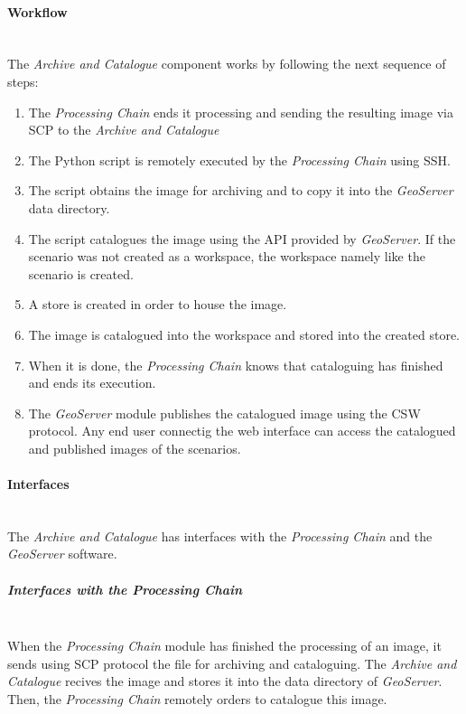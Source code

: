 \paragraph{Workflow}~\\

The \emph{Archive and Catalogue} component works by following the next sequence
of steps:
\begin{enumerate}
\item The \emph{Processing Chain} ends it processing and sending the resulting
  image via \ac{SCP} to the \emph{Archive and Catalogue} 
\item The Python script is remotely executed by the \emph{Processing Chain}
  using \ac{SSH}.
\item The script obtains the image for archiving and to copy it into the
  \emph{GeoServer} data directory.
\item The script catalogues the image using the \ac{API} provided by
  \emph{GeoServer}. If the scenario was not created as a workspace, the
  workspace namely like the scenario is created.
  \item A store is created in order to house the image.
  \item The image is catalogued into the workspace and stored into the created store.
\item When it is done, the \emph{Processing Chain} knows that cataloguing has
  finished and ends its execution.
\item The \emph{GeoServer} module publishes the catalogued image using the
  \ac{CSW} protocol. Any end user connectig the web interface can access the
  catalogued and published images of the scenarios.
\end{enumerate}

\paragraph{Interfaces}~\\

The \emph{Archive and Catalogue} has interfaces with the \emph{Processing Chain}
and the \emph{GeoServer} software. 

\subparagraph{Interfaces with the Processing Chain}~\\

When the \emph{Processing Chain} module has finished the processing of an image,
it sends using \ac{SCP} protocol the file for archiving and cataloguing. The
\emph{Archive and Catalogue} recives the image and stores it into the data
directory of \emph{GeoServer}. Then, the \emph{Processing Chain} remotely orders
to catalogue this image.  

